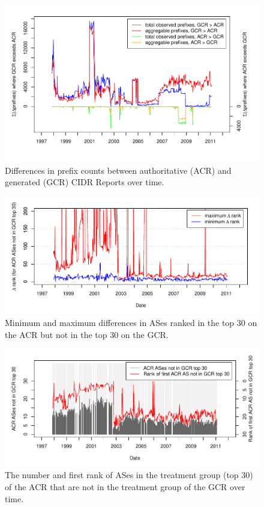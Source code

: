 \begin{figure}
\includegraphics[width=6in]{figures/cidr_report_validity_prefix_error.pdf}
    \caption{Differences in prefix counts between authoritative (ACR) and generated (GCR) CIDR Reports over time.}
\end{figure}

\begin{figure}
    \includegraphics[width=6in]{figures/cidr_report_validity_rank_error.pdf}
    \caption{Minimum and maximum differences in ASes ranked in the top 30 on the ACR but not in the top 30 on the GCR.}
\end{figure}

\begin{figure}
    \includegraphics[width=6in]{figures/cidr_report_validity_top30_error.pdf}
    \caption{The number and first rank of ASes in the treatment group (top 30) of the ACR that are not in the treatment group of the GCR over time.}
\end{figure}

